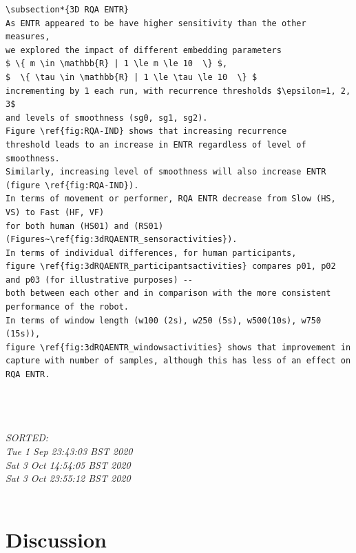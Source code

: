 \documentclass[10pt]{article}
\begin{document}
\begin{verbatim}
\subsection*{3D RQA ENTR}
As ENTR appeared to be have higher sensitivity than the other measures, 
we explored the impact of different embedding parameters 
$ \{ m \in \mathbb{R} | 1 \le m \le 10  \} $,
$  \{ \tau \in \mathbb{R} | 1 \le \tau \le 10  \} $ 
incrementing by 1 each run, with recurrence thresholds $\epsilon=1, 2, 3$ 
and levels of smoothness (sg0, sg1, sg2).  
Figure \ref{fig:RQA-IND} shows that increasing recurrence 
threshold leads to an increase in ENTR regardless of level of smoothness.  
Similarly, increasing level of smoothness will also increase ENTR (figure \ref{fig:RQA-IND}).
In terms of movement or performer, RQA ENTR decrease from Slow (HS, VS) to Fast (HF, VF) 
for both human (HS01) and (RS01) (Figures~\ref{fig:3dRQAENTR_sensoractivities}).
In terms of individual differences, for human participants, 
figure \ref{fig:3dRQAENTR_participantsactivities} compares p01, p02 and p03 (for illustrative purposes) --
both between each other and in comparison with the more consistent performance of the robot.  
In terms of window length (w100 (2s), w250 (5s), w500(10s), w750 (15s)), 
figure \ref{fig:3dRQAENTR_windowsactivities} shows that improvement in 
capture with number of samples, although this has less of an effect on RQA ENTR.




\end{verbatim}



\textit{
SORTED: \\ 
Tue  1 Sep 23:43:03 BST 2020\\
Sat  3 Oct 14:54:05 BST 2020\\
Sat  3 Oct 23:55:12 BST 2020 \\
}
\\


\section{Discussion}
\end{document}
